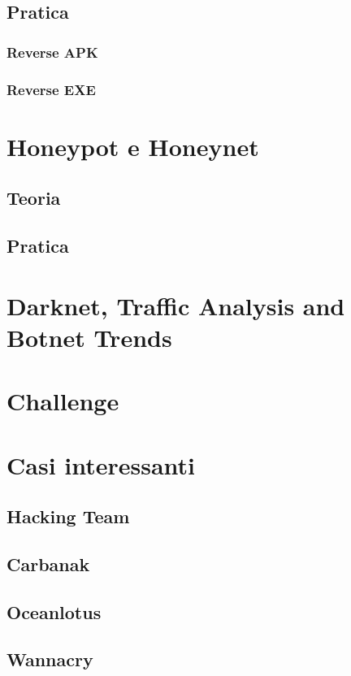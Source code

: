 \documentclass{article}
\begin{document}
\subsection{Pratica}

\subsubsection{Reverse APK}

\subsubsection{Reverse EXE}

\section{Honeypot e Honeynet}
\subsection{Teoria}

\subsection{Pratica}

\section{Darknet, Traffic Analysis and Botnet Trends}

\section{Challenge}


\section{Casi interessanti}

\subsection{Hacking Team}

\subsection{Carbanak}

\subsection{Oceanlotus}

\subsection{Wannacry}
\end{document}
